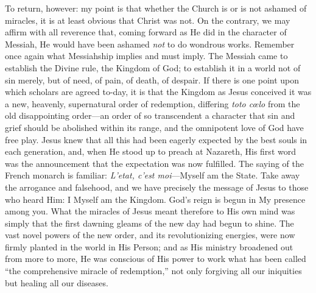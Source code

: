 \documentclass[12pt,a5paper,oneside]{book}
\begin{document}
To return, however: my point is that whether
the Church is or is not ashamed of miracles,
it is at least obvious that Christ was not. On
the contrary, we may affirm with all reverence
that, coming forward as He did in the character
of Messiah, He would have been ashamed \textit{not}
to do wondrous works. Remember once again
what Messiahship implies and must imply.
The Messiah came to establish the Divine rule,
the Kingdom of God; to establish it in a world
not of sin merely, but of need, of pain, of
death, of despair. If there is one point upon
which scholars are agreed to-day, it is that
the Kingdom as Jesus conceived it was a new,
heavenly, supernatural order of redemption,
differing \textit{toto c{\oe}lo} from the old disappointing
order---an order of so transcendent a character
that sin and grief should be abolished within
its range, and the omnipotent love of God have
free play. Jesus knew that all this had been
eagerly expected by the best souls in each
generation, and, when He stood up to preach at
Nazareth, His first word was the announcement
that the expectation was now fulfilled. The
saying of the French monarch is familiar:
\textit{L'etat, c'est moi}---Myself am the State. Take
away the arrogance and falsehood, and we have
precisely the message of Jesus to those who
heard Him: I Myself am the Kingdom. God's
reign is begun in My presence among you.
What the miracles of Jesus meant therefore to
His own mind was simply that the first dawning
gleams of the new day had begun to shine.
The vast novel powers of the new order,
and its revolutionizing energies, were now firmly
planted in the world in His Person; and as
His ministry broadened out from more to more,
He was conscious of His power to work what
has been called ``the comprehensive miracle
of redemption,'' not only forgiving all our
iniquities but healing all our diseases.
\end{document}
